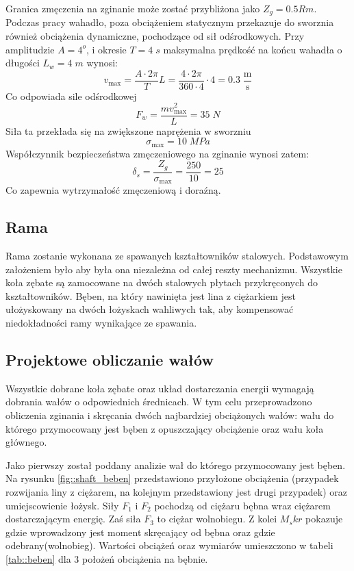 Granica zmęczenia na zginanie może zostać przybliżona jako \(Z_g = 0.5Rm\). Podczas pracy wahadło, poza obciążeniem statycznym przekazuje do sworznia również obciążenia dynamiczne, pochodzące od sił odśrodkowych. Przy amplitudzie \(A = 4^o\), i okresie \(T = 4 \; s\) maksymalna prędkość na końcu wahadła o długości \(L_w = 4\;m\) wynosi:
\begin{equation}
v_{\max} = \frac{A \cdot 2\pi}{T}L = \frac{4 \cdot 2\pi}{360 \cdot 4}\cdot4 = 0.3\; \dfrac{\text{m}}{\text{s}}
\end{equation}
Co odpowiada sile odśrodkowej
\begin{equation}
F_w = \frac{m v_{\max}^2}{L} = 35\; N
\end{equation}
Siła ta przekłada się na zwiększone naprężenia w sworzniu
\begin{equation}
\sigma_{\max} = 10\; MPa
\end{equation}
Współczynnik bezpieczeństwa zmęczeniowego na zginanie wynosi zatem:
\begin{equation}
\delta_s = \frac{Z_g}{\sigma_{\max}} = \frac{250}{10} = 25
\end{equation}
Co zapewnia wytrzymałość zmęczeniową i doraźną.

        \subsection{Rama}
        	Rama zostanie wykonana ze spawanych kształtowników stalowych. Podstawowym założeniem było aby była ona niezależna od całej reszty mechanizmu. Wszystkie koła zębate są zamocowane na dwóch stalowych płytach przykręconych do kształtowników. Bęben, na który nawinięta jest lina z ciężarkiem jest ułożyskowany na dwóch łożyskach wahliwych tak, aby kompensować niedokładności ramy wynikające ze spawania.
        	
        	
        \subsection{Projektowe obliczanie wałów}
        	Wszystkie dobrane koła zębate oraz układ dostarczania energii wymagają dobrania wałów o odpowiednich średnicach.
        	W tym celu przeprowadzono obliczenia zginania i skręcania dwóch najbardziej obciążonych wałów: wału do którego przymocowany jest bęben z opuszczający obciążenie oraz wału koła głównego.
        	
        	Jako pierwszy został poddany analizie wał do którego przymocowany jest bęben.
        	Na rysunku \ref{fig::shaft_beben} przedstawiono przyłożone obciążenia (przypadek rozwijania liny z ciężarem, na kolejnym przedstawiony jest drugi przypadek) oraz umiejscowienie łożysk. Siły $F_1$ i $F_2$ pochodzą od ciężaru bębna wraz ciężarem dostarczającym energię.
        	Zaś siła $F_3$ to ciężar wolnobiegu.
        	Z kolei $M_skr$ pokazuje gdzie wprowadzony jest moment skręcający od bębna oraz gdzie odebrany(wolnobieg).
        	Wartości obciążeń oraz wymiarów umieszczono w tabeli \ref{tab::beben} dla 3 położeń obciążenia na bębnie.
        	
